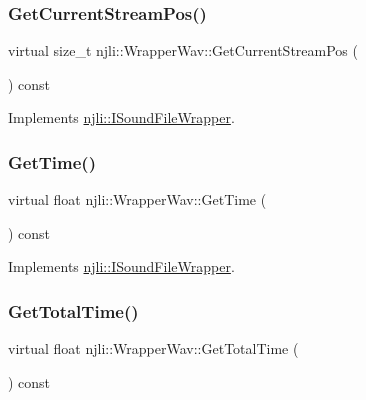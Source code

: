\subsubsection{\texorpdfstring{Get\+Current\+Stream\+Pos()}{GetCurrentStreamPos()}}
{\footnotesize\ttfamily virtual size\+\_\+t njli\+::\+Wrapper\+Wav\+::\+Get\+Current\+Stream\+Pos (\begin{DoxyParamCaption}{ }\end{DoxyParamCaption}) const\hspace{0.3cm}{\ttfamily [virtual]}}



Implements \mbox{\hyperlink{classnjli_1_1_i_sound_file_wrapper_a7468aaf1e53cfd6feb38eae4ecf8ab99}{njli\+::\+I\+Sound\+File\+Wrapper}}.

\mbox{\label{classnjli_1_1_wrapper_wav_a0cfe149e0e1089f153401f3c80a222df}} 
\subsubsection{\texorpdfstring{Get\+Time()}{GetTime()}}
{\footnotesize\ttfamily virtual float njli\+::\+Wrapper\+Wav\+::\+Get\+Time (\begin{DoxyParamCaption}{ }\end{DoxyParamCaption}) const\hspace{0.3cm}{\ttfamily [virtual]}}



Implements \mbox{\hyperlink{classnjli_1_1_i_sound_file_wrapper_afefb180620c4a6e17e994a867726eb29}{njli\+::\+I\+Sound\+File\+Wrapper}}.

\mbox{\label{classnjli_1_1_wrapper_wav_ae281e2ac23707e6eb2c1f2e7fcb58881}} 
\subsubsection{\texorpdfstring{Get\+Total\+Time()}{GetTotalTime()}}
{\footnotesize\ttfamily virtual float njli\+::\+Wrapper\+Wav\+::\+Get\+Total\+Time (\begin{DoxyParamCaption}{ }\end{DoxyParamCaption}) const\hspace{0.3cm}{\ttfamily [virtual]}}




